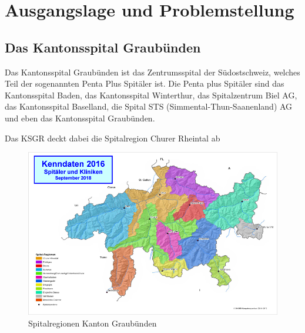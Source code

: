 

\section{Ausgangslage und Problemstellung}
\subsection{Das Kantonsspital Graubünden}
Das Kantonsspital Graubünden ist das Zentrumsspital der Südostschweiz, welches Teil der sogenannten Penta Plus Spitäler ist.
Die Penta plus Spitäler sind das Kantonsspital Baden, das Kantonsspital Winterthur, das Spitalzentrum Biel AG, das Kantonsspital Baselland, die Spital STS (Simmental-Thun-Saanenland) AG und eben das Kantonsspital Graubünden.

Das KSGR deckt dabei die Spitalregion Churer Rheintal ab
\begin{figure}[H]
    \centering
    \includegraphics[width=1\linewidth]{source/introduction/initial_situation/gr_spitalregionen}
    \caption{Spitalregionen Kanton Graubünden\cite{ER2J77MB}}
    \label{fig:gr_spitalregionen}
\end{figure}


